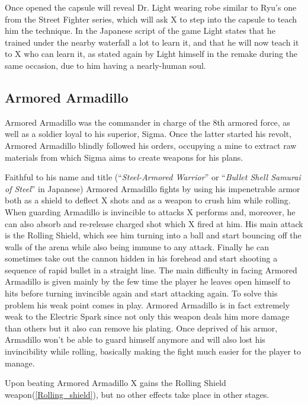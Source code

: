 Once opened the capsule will reveal Dr. Light wearing robe similar to Ryu's one from the Street Fighter series, which will ask X to step into the capsule to teach him the technique. In the Japanese  script of the game\cite{wordpress:X_japanese_script} Light states that he trained under the nearby waterfall a lot to learn it, and that he will now teach it to X who can learn it, as stated again by Light himself in the \mhx remake during the same occasion, due to him having a nearly-human soul.

\subsection{Armored Armadillo}
Armored Armadillo was the commander in charge of the 8th armored force, as well as a soldier loyal to his superior, Sigma. Once the latter started his revolt, Armored Armadillo blindly followed his orders, occupying a mine to extract raw materials from which Sigma aims to create weapons for his plans.

Faithful to his name and title (``\textit{Steel-Armored Warrior}''\cite{MHX:manual} or ``\textit{Bullet Shell Samurai of Steel}''\cite{wayback:X_resources} in Japanese) Armored Armadillo fights by using his impenetrable armor both as a shield to deflect X shots and as a weapon to crush him while rolling. When guarding Armadillo is invincible to attacks X performs and, moreover, he can also absorb and re-release charged shot which X fired at him. His main attack is the Rolling Shield, which see him turning into a ball and start bouncing off the walls of the arena while also being immune to any attack. Finally he can sometimes take out the cannon hidden in his forehead and start shooting a sequence of rapid bullet in a straight line. The main difficulty in facing Armored Armadillo is given mainly by the few time the player he leaves open himself to hits before turning invincible again and start attacking again. To solve this problem his weak point comes in play. Armored Armadillo is in fact extremely weak to the Electric Spark since not only this weapon deals him more damage than others but it also can remove his plating. Once deprived of his armor, Armadillo won't be able to guard himself anymore and will also lost his invincibility while rolling, basically making the fight much easier for the player to manage.

Upon beating Armored Armadillo X gains the Rolling Shield weapon(\ref{Rolling_shield}), but no other effects take place in other stages.


